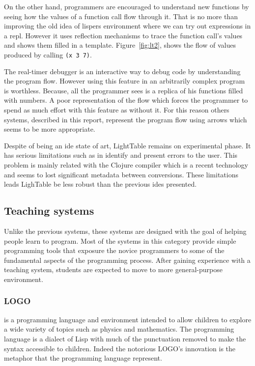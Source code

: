 On the other hand, programmers are encouraged to understand new functions by seeing how the values of a function call flow through it. That is no more than improving the old idea of lispers environment where we can try out expressions in a \ac{repl}. However it uses reflection mechanisms to trace the function call's values and shows them filled in a template. Figure~\ref{fig:lt2}, shows the flow of values produced by calling \texttt{(x 3 7)}.

The real-timer debugger is an interactive way to debug code by understanding the program flow. However using this feature in an arbitrarily complex program is worthless. Because, all the programmer sees is a replica of his functions filled with numbers. A poor representation of the flow which forces the programmer to spend as much effort with this feature as without it. For this reason others systems, described in this report, represent the program flow using arrows which seems to be more appropriate.

Despite of being an \ac{ide} state of art, LightTable remains on experimental phase. It has serious limitations such as in identify and present errors to the user. This problem is mainly related with the Clojure compiler which is a recent technology and seems to lost significant metadata between conversions. These limitations leads LighTable be less robust than the previous \ac{ide}s presented.
\subsection{Teaching systems}

Unlike the previous systems, these systems are designed with the goal of helping people learn to program. Most of the systems in this category provide simple programming tools that exposure the novice programmers to some of the fundamental aspects of the programming process. After gaining experience with a teaching system, students are expected to move to more general-purpose environment. 

\subsubsection{LOGO~\cite{papert1980mindstorms}} is a programming language and environment intended to allow children to explore a wide variety of topics such as physics and mathematics. The programming language is a dialect of Lisp with much of the punctuation removed to make the syntax accessible to children. Indeed the notorious LOGO's innovation is the metaphor that the programming language represent.

